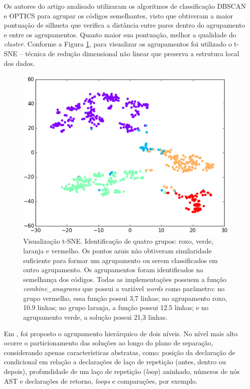     Os autores do artigo analisado utilizaram os algoritmos de classificação
    DBSCAN e OPTICS para agrupar os códigos semelhantes, visto que obtiveram
    a maior pontuação de silhueta que verifica a distância entre pares dentro
    do agrupamento e entre os agrupamentos. Quanto maior sua pontuação, melhor
    a qualidade do \textit{cluster}. Conforme a Figura \ref{fig:t-SNE}, para
    visualizar os agrupamentos foi utilizado o t-SNE – técnica de redução
    dimensional não linear que preserva a estrutura local dos dados.
    \begin{figure}[ht]
        \centering
        \includegraphics[scale=0.5]{imagem/visualizacao-tSNE.png}
        \caption{Visualização t-SNE. Identificação de quatro grupos: roxo, verde,
        	laranja e vermelho. Os pontos azuis não obtiveram similaridade
        	suficiente para formar um agrupamento ou serem classificados em
        	outro agrupamento. Os agrupamentos foram identificados na semelhança
        	dos códigos. Todas as implementações possuem a função \textit{combine\_anagrams}
        	que possui a variável \textit{words} como parâmetro: no grupo vermelho,
        	essa função possui 3,7 linhas; no agrupamento roxo, 10.9 linhas; no
        	grupo laranja, a função possui 12.5 linhas; e no agrupamento verde,
        	a solução possui 21,3 linhas.}
        \label{fig:t-SNE}
    \end{figure}

    
    Em , foi proposto o agrupamento hierárquico de dois
    níveis. No nível mais alto ocorre o particionamento das soluções ao longo do
    plano de separação, considerando apenas características abstratas, como:
    posição da declaração de condicional em relação a declarações de laço de
    repetição (antes, dentro ou depois), profundidade de um laço de repetição
    (\textit{loop}) aninhado, números de nós AST e declarações de retorno,
    \textit{loops} e comparações, por exemplo.
    
